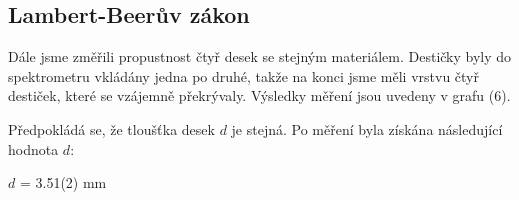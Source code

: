 \documentclass[a4paper,11pt]{article}
\begin{document}
\begin{minipage}[t]{0.5\textwidth}
            \subsection{Lambert-Beerův zákon}   
                Dále jsme změřili propustnost čtyř desek se stejným materiálem. Destičky byly do spektrometru vkládány jedna po druhé, takže na konci jsme měli vrstvu čtyř destiček, které se vzájemně překrývaly. Výsledky měření jsou uvedeny v grafu (6).
                \par Předpokládá se, že tloušťka desek $d$ je stejná. Po měření byla získána následující hodnota $d$: 
                \begin{center}
                    $d$ = 3.51(2) mm
                \end{center}
    \end{minipage}
    \hspace{10pt}  
\end{document}
